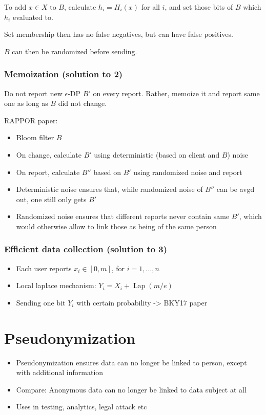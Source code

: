 \documentclass[a4paper]{scrreprt}
\begin{document}
To add $x \in X$ to $B$, calculate $h_i = H_i(x)$ for all $i$, and set those
bits of $B$ which $h_i$ evaluated to.

Set membership then has no false negatives, but can have false positives.

$B$ can then be randomized before sending.

\subsection{Memoization (solution to 2)}

Do not report new $\epsilon$-DP $B'$ on every report. Rather, memoize it and
report same one as long as $B$ did not change.

RAPPOR paper:
\begin{itemize}
		\item Bloom filter $B$
		\item On change, calculate $B'$ using deterministic (based on client and $B$) noise
		\item On report, calculate $B''$ based on $B'$ using randomized noise and report
		\item Deterministic noise ensures that, while randomized noise of $B''$
				can be avgd out, one still only gets $B'$
		\item Randomized noise ensures that different reports never contain
				same $B'$, which would otherwise allow to link those as being
				of the same person
\end{itemize}

\subsection{Efficient data collection (solution to 3)}

\begin{itemize}
		\item Each user reports $x_i \in [0, m]$, for $i = 1, \ldots, n$
		\item Local laplace mechanism: $Y_i = X_i + \operatorname{Lap}(m/e)$
		\item Sending one bit $Y_i$ with certain probability -> BKY17 paper
\end{itemize}

\chapter{Pseudonymization}

\begin{itemize}
		\item Pseudonymization ensures data can no longer be linked to person,
				except with additional information
		\item Compare: Anonymous data can no longer be linked to data subject
				at all
		\item Uses in testing, analytics, legal attack etc
\end{itemize}
\end{document}
